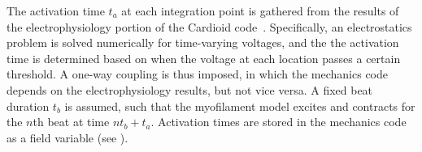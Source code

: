 The activation time $t_a$ at each integration point is gathered from the results of the electrophysiology portion of the Cardioid code~\cite{richards_2013}. Specifically, an electrostatics problem is solved numerically for time-varying voltages, and the the activation time is determined based on when the voltage at each location passes a certain threshold. A one-way coupling is thus imposed, in which the mechanics code depends on the electrophysiology results, but not vice versa. A fixed beat duration $t_b$ is assumed, such that the myofilament model excites and contracts for the $n$th beat at time $nt_b + t_a$. Activation times are stored in the mechanics code as a field variable (see ).

\begin{figure}
\centering
{}
\end{figure}
